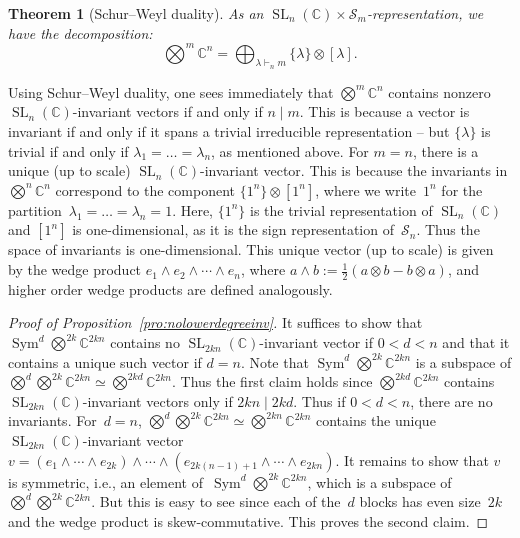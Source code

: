 \documentclass[10pt,a4paper]{article}
\newtheorem{theorem}{Theorem}
\newcommand{\C}{\mathbb C}
\newcommand{\SL}{\operatorname{SL}}
\newcommand{\Sym}{\operatorname{Sym}}
\newcommand{\tensor}{\textstyle\bigotimes}
\newcommand{\la}{\lambda}
\begin{document}
\begin{theorem} [Schur--Weyl duality]
As an $\SL_n(\C) \times \mathcal{S}_m$-representation, we have the decomposition:
\[ 
\tensor^m \C^n = \bigoplus_{\la \vdash_n m} \{\la\}\otimes[\la].
\] 
\end{theorem}

\noindent
Using Schur--Weyl duality, one sees immediately that $\tensor^m \C^n$ contains nonzero $\SL_n(\C)$-invariant vectors if and only if $n \mid m$.
This is because a vector is invariant if and only if it spans a trivial irreducible representation -- but $\{\la\}$ is trivial if and only if $\la_1=\ldots=\la_n$, as mentioned above.
For $m=n$, there is a unique (up to scale) $\SL_n(\C)$-invariant vector.
This is because the invariants in $\tensor^n \C^n$ correspond to the component $\{1^n\} \otimes [1^n]$, where we write~$1^n$ for the partition~$\la_1=\ldots=\la_n=1$.
Here, $\{1^n\}$ is the trivial representation of $\SL_n(\C)$ and $[1^n]$ is one-dimensional, as it is the sign representation of~$\mathcal{S}_n$.
Thus the space of invariants is one-dimensional. This unique vector (up to scale) is given by the wedge product $e_1 \wedge e_2 \wedge \cdots \wedge e_n$, where $a \wedge b := \frac 1 2 (a \otimes b - b \otimes a)$, and higher order wedge products are defined analogously.

\begin{proof}[Proof of Proposition~\ref{pro:nolowerdegreeinv}]
It suffices to show that $\Sym^d \tensor^{2k} \C^{2kn}$ contains no $\SL_{2kn}(\C)$-invariant vector if $0<d<n$ and that it contains a unique such vector if $d=n$.
Note that $\Sym^d \tensor^{2k} \C^{2kn}$ is a subspace of $\tensor^d \tensor^{2k} \C^{2kn} \simeq \tensor^{2kd} \C^{2kn}$.
Thus the first claim holds since $\tensor^{2kd} \C^{2kn}$ contains $\SL_{2kn}(\C)$-invariant vectors only if $2kn \mid 2kd$. Thus if $0 < d < n$, there are no invariants.
For~$d=n$, $\tensor^d \tensor^{2k} \C^{2kn} \simeq \tensor^{2kn} \C^{2kn}$ contains the unique $\SL_{2kn}(\C)$-invariant vector $v = (e_1 \wedge \cdots \wedge e_{2k}) \wedge \cdots \wedge (e_{2k(n-1)+1} \wedge \cdots \wedge e_{2kn})$.
It remains to show that $v$ is symmetric, i.e., an element of~$\Sym^d \tensor^{2k} \C^{2kn}$, which is a subspace of $\tensor^d \tensor^{2k} \C^{2kn}$.
But this is easy to see since each of the~$d$ blocks has even size~$2k$ and the wedge product is skew-commutative.
This proves the second claim.
\end{proof}

%
%

%
%
\end{document}
